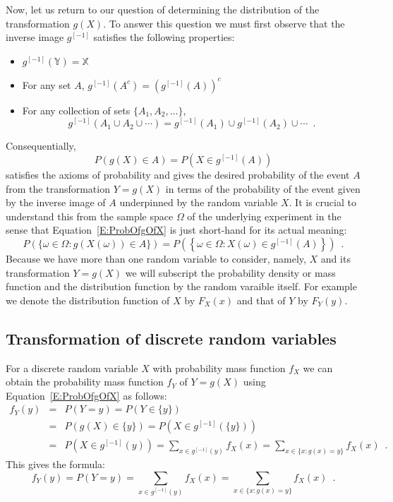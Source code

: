 Now, let us return to our question of determining the distribution of the transformation $g(X)$.  To answer this question we must first observe that the inverse image $g^{[-1]}$ satisfies the following properties:
\begin{itemize}
\item $g^{[-1]}(\mathbb{Y}) = \mathbb{X}$
\item For any set $A$, $g^{[-1]}(A^c) = \left(g^{[-1]}(A)\right)^c$
\item For any collection of sets $\{A_1,A_2,\ldots\}$,
\[
g^{[-1]}\left( A_1 \cup A_2 \cup \cdots \right) = g^{[-1]}(A_1) \cup g^{[-1]}(A_2) \cup \cdots \enspace.
\]
\end{itemize}
Consequentially, 
\begin{equation}\label{E:ProbOfgOfX}
\boxed{P \left( g(X) \in A \right) = P \left(X \in g^{[-1]}(A) \right)}
\end{equation} 
satisfies the axioms of probability and gives the desired probability of the event $A$ from the transformation $Y=g(X)$ in terms of the probability of the event given by the inverse image of $A$ underpinned by the random variable $X$.  
It is crucial to understand this from the sample space $\Omega$ of the underlying experiment in the sense that Equation~\eqref{E:ProbOfgOfX} is just short-hand for its actual meaning:
\[
P \left( \{\omega \in \Omega: g(X(\omega)) \in A\} \right) 
= P \left( \left\{ \omega \in \Omega: X(\omega) \in g^{[-1]}(A) \right\} \right) \enspace .
\]
Because we have more than one random variable to consider, namely, $X$ and its transformation $Y=g(X)$ we will subscript the probability density or mass function and the distribution function by the random varaible itself.  For example we denote the distribution function of $X$ by $F_X(x)$ and that of $Y$ by $F_Y(y)$.

\subsection{Transformation of discrete random variables}
For a discrete random variable $X$ with probability mass function $f_X$ we can obtain the probability mass function $f_Y$ of $Y=g(X)$ using Equation~\eqref{E:ProbOfgOfX} as follows:
\begin{eqnarray*}
f_Y(y) 
&=& P(Y =y) = P(Y \in \{y\}) \\
&=& P \left( g(X) \in \{y\} \right) = P \left(X \in g^{[-1]}(\{y\}) \right)\\
&=& P \left(X \in g^{[-1]}(y) \right) = \sum_{x \in g^{[-1]}(y)} f_X(x) = \sum_{x \in \{x: g(x)=y\}} f_X(x) \enspace .
\end{eqnarray*}
This gives the formula:
\begin{equation}\label{E:PMFOfgOfX}
\boxed{
f_Y(y) = P(Y =y) = \sum_{x \in g^{[-1]}(y)} f_X(x) = \sum_{x \in \{x: g(x)=y\}} f_X(x) \enspace .
}
\end{equation}


